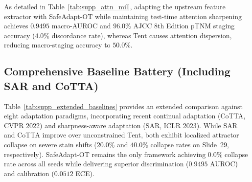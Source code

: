 \documentclass[journal]{IEEEtran}
\begin{document}
As detailed in Table~\ref{tab:supp_attn_mil}, adapting the upstream feature extractor with SafeAdapt-OT while maintaining test-time attention sharpening achieves $0.9495$ macro-AUROC and $96.0\%$ AJCC 8th Edition pTNM staging accuracy ($4.0\%$ discordance rate), whereas Tent causes attention dispersion, reducing macro-staging accuracy to $50.0\%$.

\setcounter{table}{3}
\begin{table}[b]
\centering
\caption{Whole-Slide Image Attention-MIL Staging Performance (Hospital~2 WSIs).}
\label{tab:supp_attn_mil}
\end{table}

\subsection{Comprehensive Baseline Battery (Including SAR and CoTTA)}
Table~\ref{tab:supp_extended_baselines} provides an extended comparison against eight adaptation paradigms, incorporating recent continual adaptation (CoTTA, CVPR 2022) and sharpness-aware adaptation (SAR, ICLR 2023). While SAR and CoTTA improve over unconstrained Tent, both exhibit localized attractor collapse on severe stain shifts ($20.0\%$ and $40.0\%$ collapse rates on Slide~29, respectively). SafeAdapt-OT remains the only framework achieving $0.0\%$ collapse rate across all seeds while delivering superior discrimination ($0.9495$ AUROC) and calibration ($0.0512$ ECE).
\end{document}
